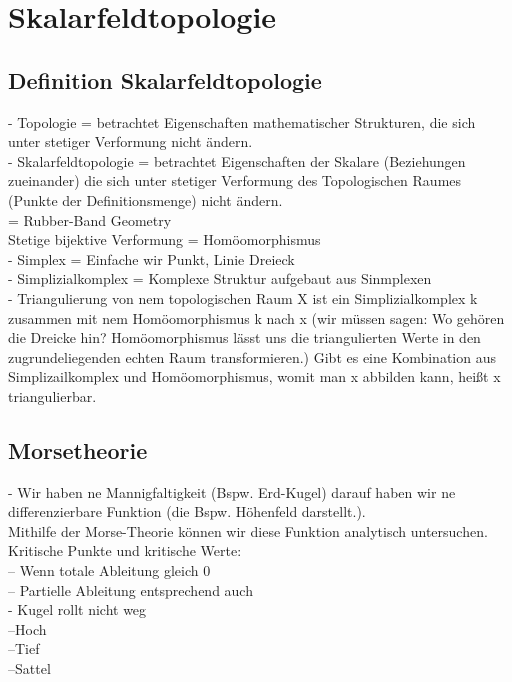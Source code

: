 \documentclass{article}
\begin{document}
\pagebreak
\section{Skalarfeldtopologie}

\subsection{Definition Skalarfeldtopologie}
- Topologie = betrachtet Eigenschaften mathematischer Strukturen, die sich unter stetiger Verformung nicht ändern.\\
- Skalarfeldtopologie = betrachtet Eigenschaften der Skalare (Beziehungen zueinander) die sich unter stetiger Verformung des Topologischen Raumes (Punkte der Definitionsmenge) nicht ändern.\\
= Rubber-Band Geometry\\
Stetige bijektive Verformung = Homöomorphismus\\


\noindent - Simplex = Einfache wir Punkt, Linie Dreieck\\
- Simplizialkomplex = Komplexe Struktur aufgebaut aus Sinmplexen\\
- Triangulierung von nem topologischen Raum X ist ein Simplizialkomplex k zusammen mit nem Homöomorphismus k nach x (wir müssen sagen: Wo gehören die Dreicke hin? Homöomorphismus lässt uns die triangulierten Werte in den zugrundeliegenden echten Raum transformieren.) Gibt es eine Kombination aus Simplizailkomplex und Homöomorphismus, womit man x abbilden kann, heißt x triangulierbar.


\subsection{Morsetheorie}
- Wir haben ne Mannigfaltigkeit (Bspw. Erd-Kugel) darauf haben wir ne differenzierbare Funktion (die Bspw. Höhenfeld darstellt.).\\
 Mithilfe der Morse-Theorie können wir diese Funktion analytisch untersuchen.\\

\noindent Kritische Punkte und kritische Werte:\\
-- Wenn totale Ableitung gleich 0\\
-- Partielle Ableitung entsprechend auch\\
- Kugel rollt nicht weg\\
--Hoch\\
--Tief\\
--Sattel\\
\end{document}
